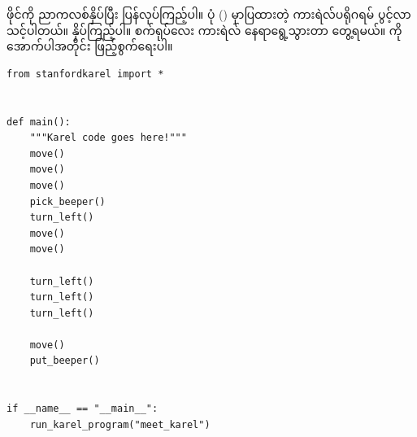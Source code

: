  ဖိုင်ကို ညာကလစ်နှိပ်ပြီး  ပြန်လုပ်ကြည့်ပါ။ ပုံ (\fRefNo{\ref{fig:mtkrlprgm}}) မှာပြထားတဲ့ ကားရဲလ်ပရိုဂရမ် ပွင့်လာသင့်ပါတယ်။  နှိပ်ကြည့်ပါ။ စက်ရုပ်လေး ကားရဲလ် နေရာရွေ့သွားတာ တွေ့ရမယ်။  ကို အောက်ပါအတိုင်း ဖြည့်စွက်ရေးပါ။
\begin{figure}[tbh!]
\caption{} 
\label{fig:mtkrlprgm}
\end{figure}


%
\setlength{\fboxsep}{0pt}
\begin{verbatim}
from stanfordkarel import *


def main():
    """Karel code goes here!"""
    move()
    move()
    move()
    pick_beeper()
    turn_left()
    move()
    move()

    turn_left()
    turn_left()
    turn_left()

    move()
    put_beeper()


if __name__ == "__main__":
    run_karel_program("meet_karel")
\end{verbatim}
%

